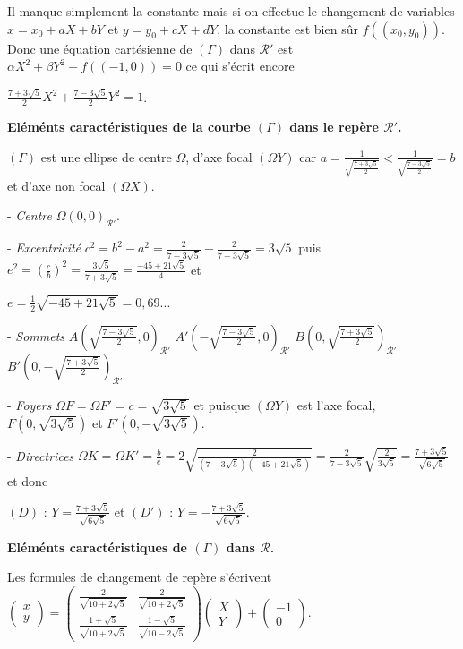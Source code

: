{\begin{enumerate}
{Il manque simplement la constante mais si on effectue le changement de variables $x = x_0+aX+bY$ et $y = y_0+cX+dY$, la constante est bien sûr $f((x_0,y_0))$. Donc une équation cartésienne de $(\Gamma)$ dans $\mathcal{R}'$ est $\alpha X^2+\beta Y^2+f((-1,0))= 0$ ce qui s'écrit encore

\begin{center}
$\frac{7+3\sqrt{5}}{2}X^2+\frac{7-3\sqrt{5}}{2}Y^2 = 1$.
\end{center}

\textbf{Eléménts caractéristiques de la courbe $(\Gamma)$ dans le repère $\mathcal{R}'$.}

$(\Gamma)$ est une ellipse de centre $\Omega$, d'axe focal $(\Omega Y)$ car $a=\frac{1}{\sqrt{\frac{7+3\sqrt{5}}{2}}}<\frac{1}{\sqrt{\frac{7-3\sqrt{5}}{2}}}=b$ et d'axe non focal $(\Omega X)$.

- \emph{Centre} $\Omega(0,0)_{\mathcal{R}'}$.
 
 
- \emph{Excentricité} $c^2=b^2-a^2 =\frac{2}{7-3\sqrt{5}}-\frac{2}{7+3\sqrt{5}}=3\sqrt{5}$ puis $e^2 =\left(\frac{c}{b}\right)^2=\frac{3\sqrt{5}}{7+3\sqrt{5}}=\frac{-45+21\sqrt{5}}{4}$ et 

$e=\frac{1}{2}\sqrt{-45+21\sqrt{5}}= 0,69...$
 
- \emph{Sommets} $A\left(\sqrt{\frac{7-3\sqrt{5}}{2}},0\right)_{\mathcal{R}'}$  $A'\left(-\sqrt{\frac{7-3\sqrt{5}}{2}},0\right)_{\mathcal{R}'}$  $B\left(0,\sqrt{\frac{7+3\sqrt{5}}{2}}\right)_{\mathcal{R}'}$  $B'\left(0,-\sqrt{\frac{7+3\sqrt{5}}{2}}\right)_{\mathcal{R}'}$ 

- \emph{Foyers} $\Omega F =\Omega F'=c=\sqrt{3\sqrt{5}}$  et puisque $(\Omega Y)$ est l'axe focal, $F(0,\sqrt{3\sqrt{5}})$ et $F'(0,-\sqrt{3\sqrt{5}})$. 

- \emph{Directrices} $\Omega K =\Omega K'=\frac{b}{e}=2\sqrt{\frac{2}{(7-3\sqrt{5})(-45+21\sqrt{5})}}=\frac{2}{7-3\sqrt{5}}\sqrt{\frac{2}{3\sqrt{5}}}=\frac{7+3\sqrt{5}}{\sqrt{6\sqrt{5}}}$ et donc 

$(D)$ : $Y =\frac{7+3\sqrt{5}}{\sqrt{6\sqrt{5}}}$ et $(D')$ : $Y = -\frac{7+3\sqrt{5}}{\sqrt{6\sqrt{5}}}$. 

\textbf{Eléménts caractéristiques de $(\Gamma)$ dans $\mathcal{R}$.}

Les formules de changement de repère s'écrivent $\left(\begin{array}{c}
x\\
y
\end{array}
\right)=\left(
\begin{array}{cc}
\frac{2}{\sqrt{10+2\sqrt{5}}}&\frac{2}{\sqrt{10+2\sqrt{5}}}\\
\frac{1+\sqrt{5}}{\sqrt{10+2\sqrt{5}}}&\frac{1-\sqrt{5}}{\sqrt{10-2\sqrt{5}}}
\end{array}
\right)\left(\begin{array}{c}
X\\
Y
\end{array}
\right)+\left(\begin{array}{c}
-1\\
0
\end{array}
\right)$.

}
\end{enumerate}}
